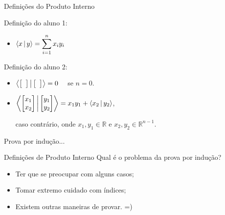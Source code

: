 \begin{frame}{Definições do Produto Interno}
  \vfill
  \begin{minipage}[t]{0.45\textwidth}
    Definição do aluno 1:
    \vspace{0.5cm}
    \begin{itemize}
      \item $\left\langle x \, \middle| \, y \right\rangle = \displaystyle\sum_{i=1}^{n} x_i y_i$
    \end{itemize}
  \end{minipage}
  \hfill
  \vrule
  \hfill
  \begin{minipage}[t]{0.50\textwidth}
    Definição do aluno 2:
    \vspace{0.5cm}
    \begin{itemize}
      \item $\left\langle \begin{bmatrix} \hphantom{a} \end{bmatrix} \, \middle| \, \begin{bmatrix} \hphantom{a} \end{bmatrix} \right\rangle = 0 \quad$ se $n = 0$.
      \vspace{0.5cm}
      \item $\left\langle \begin{bmatrix} x_1 \\ x_2 \end{bmatrix} \, \middle| \, \begin{bmatrix} y_1 \\ y_2 \end{bmatrix} \right\rangle = x_1 y_1 + \left\langle x_2 \, \middle| \, y_2 \right\rangle$,

      \vspace{0.3cm}
      caso contrário, onde $x_1, y_1 \in \mathbb{R}$ e $x_2, y_2 \in \mathbb{R}^{n-1}$.
    \end{itemize}
  \end{minipage}
  \vfill \pause
  \begin{center}
    Prova por indução...
  \end{center}
\end{frame}

\begin{frame}{Definições de Produto Interno}
  Qual é o problema da prova por indução?
  \pause
  \vspace{1cm}
  \begin{itemize}
    \item Ter que se preocupar com alguns casos; \pause \\[0.3cm]
    \item Tomar extremo cuidado com índices; \pause \\[0.3cm]
    \item Existem outras maneiras de provar. =)
  \end{itemize}
\end{frame}
